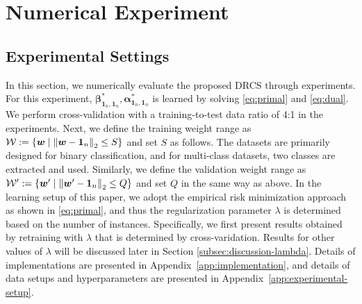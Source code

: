 
\section{Numerical Experiment}\label{sec:experiment}
\subsection{Experimental Settings}\label{subsec:exp-settings}
	In this section, we numerically evaluate the proposed DRCS through experiments.
	For this experiment, $\bm \beta_{\bm 1_n, \bm 1_n}^{*}, \bm \alpha_{\bm 1_n, \bm 1_n}^{*}$ is learned by solving \eqref{eq:primal} and \ref{eq:dual}.
	We perform cross-validation with a training-to-test data ratio of 4:1 in the experiments.
	Next, we define the training weight range as ${\cal W} := \left\{ \bm w \mid \left\|\bm w - \bm 1_n\right\|_2\leq S \right\}$ and set $S$ as follows.
	The datasets are primarily designed for binary classification, and for multi-class datasets, two classes are extracted and used.
	Similarly, we define the validation weight range as ${\cal W}' := \left\{ \bm w' \mid \left\|\bm w' - \bm 1_n\right\|_2\leq Q \right\}$ and set $Q$ in the same way as above.
	In the learning setup of this paper, we adopt the empirical risk minimization approach as shown in \eqref{eq:primal}, and thus the regularization parameter $\lambda$ is determined based on the number of instances.
	Specifically, we first present results obtained by retraining with $\lambda$ that is determined by cross-varidation. Results for other values of $\lambda$ will be discussed later in Section \ref{subsec:discussion-lambda}.
	Details of implementations are presented in Appendix~\ref{app:implementation}, and details of data setups and hyperparameters are presented in Appendix~\ref{app:experimental-setup}.


